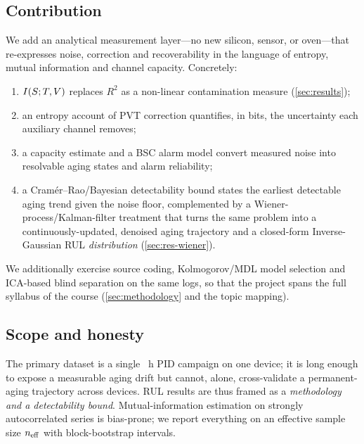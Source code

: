 \subsection{Contribution}
We add an analytical measurement layer---no new silicon, sensor, or oven---that
re-expresses noise, correction and recoverability in the language of entropy,
mutual information and channel capacity. Concretely:
\begin{enumerate}
  \item $I\!\left(S ; T,V\right)$ replaces $R^2$ as a non-linear contamination
        measure (\cref{sec:results});
  \item an entropy account of PVT correction quantifies, in bits, the
        uncertainty each auxiliary channel removes;
  \item a capacity estimate and a BSC alarm model convert measured noise into
        resolvable aging states and alarm reliability;
  \item a Cram\'er--Rao/Bayesian detectability bound states the earliest
        detectable aging trend given the noise floor, complemented by a
        Wiener-process/Kalman-filter treatment that turns the same problem
        into a continuously-updated, denoised aging trajectory and a
        closed-form Inverse-Gaussian RUL \emph{distribution}
        (\cref{sec:res-wiener}).
\end{enumerate}
We additionally exercise source coding, Kolmogorov/MDL model selection and
ICA-based blind separation on the same logs, so that the project spans the full
syllabus of the course (\cref{sec:methodology} and the topic mapping).

\subsection{Scope and honesty}
The primary dataset is a single \valDurationHours~h PID campaign on one device;
it is long enough to expose a measurable aging drift but cannot, alone,
cross-validate a permanent-aging trajectory across devices. RUL results are thus
framed as a \emph{methodology and a detectability bound}. Mutual-information
estimation on strongly autocorrelated series is bias-prone; we report everything
on an effective sample size $n_{\mathrm{eff}}$ with block-bootstrap intervals.
